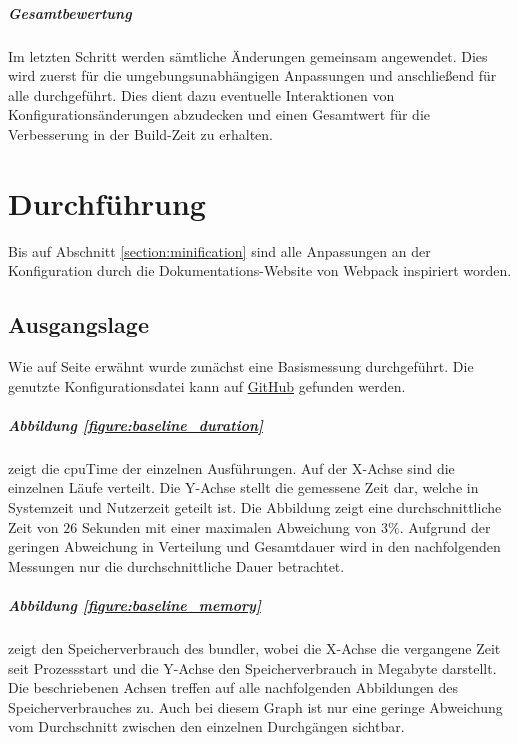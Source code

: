 \documentclass[11pt]{report}
\begin{document}
				\paragraph{Gesamtbewertung} Im letzten Schritt werden sämtliche Änderungen gemeinsam angewendet. Dies wird zuerst für die umgebungsunabhängigen Anpassungen und anschließend für alle durchgeführt. Dies dient dazu eventuelle Interaktionen von Konfigurationsänderungen abzudecken und einen Gesamtwert für die Verbesserung in der Build-Zeit zu erhalten.

	\clearpage

	\chapter{Durchführung}
		Bis auf Abschnitt \ref{section:minification} sind alle Anpassungen an der Konfiguration durch die Dokumentations-Website von Webpack inspiriert worden\cite{optimization-source:webpack}.
	
		\section{Ausgangslage}
			Wie auf Seite \pageref{baseline-build} erwähnt wurde zunächst eine Basismessung durchgeführt. Die genutzte Konfigurationsdatei kann auf \href{https://github.com/TexNAK/WebBundlerOptimization/blob/d018b3e0db6a861c4f41e38e7265ca8f9d500319/webpack-project/webpack.config.js}{GitHub} gefunden werden.			\paragraph{Abbildung \ref{figure:baseline_duration}} zeigt die \Gls{cpuTime} der einzelnen Ausführungen. Auf der X-Achse sind die einzelnen Läufe verteilt. Die Y-Achse stellt die gemessene Zeit dar, welche in Systemzeit und Nutzerzeit geteilt ist. Die Abbildung zeigt eine durchschnittliche Zeit von $26$ Sekunden mit einer maximalen Abweichung von $3\%$. Aufgrund der geringen Abweichung in Verteilung und Gesamtdauer wird in den nachfolgenden Messungen nur die durchschnittliche Dauer betrachtet.
			\paragraph{Abbildung \ref{figure:baseline_memory}} zeigt den Speicherverbrauch des \Gls{bundler}, wobei die X-Achse die vergangene Zeit seit Prozessstart und die Y-Achse den Speicherverbrauch in Megabyte darstellt. Die beschriebenen Achsen treffen auf alle nachfolgenden Abbildungen des Speicherverbrauches zu. Auch bei diesem Graph ist nur eine geringe Abweichung vom Durchschnitt zwischen den einzelnen Durchgängen sichtbar.
\end{document}
